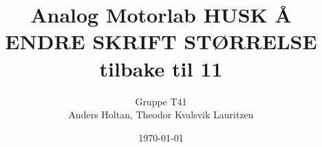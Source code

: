 \documentclass[12pt, a4paper, twocolumn, norsk]{article} %
\begin{document}
\title{Analog Motorlab HUSK Å ENDRE SKRIFT STØRRELSE tilbake til 11}
\author{Gruppe T41\\
        Anders Holtan, Theodor Kvalsvik Lauritzen}
\date{\today}


\maketitle








{}
\printbibliography{}
\label{sec:bibliography}
\end{document}

